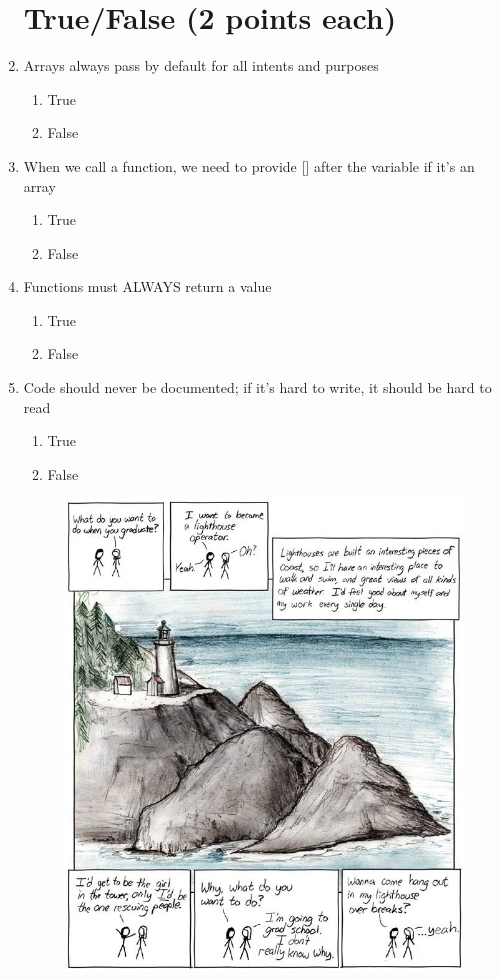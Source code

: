 \documentclass[letterpaper,12pt]{article}
\begin{document}
\begin{enumerate}
\section*{True/False (2 points each)}
   \item Arrays always pass by default for all intents and purposes
      \begin{enumerate}
         \item True
         \item False
      \end{enumerate}
   \item When we call a function, we need to provide [] after the variable if it's an array
      \begin{enumerate}
         \item True
         \item False
      \end{enumerate}
   \item Functions must ALWAYS return a value
      \begin{enumerate}
         \item True
         \item False
      \end{enumerate}
   \item Code should never be documented; if it's hard to write, it should be hard to read
      \begin{enumerate}
         \item True
         \item False
      \end{enumerate}

\begin{figure}[ht!]
	\centering
	\includegraphics[width=5in]{graduation.jpg}
\end{figure}
\newpage


\end{enumerate}
\end{document}
